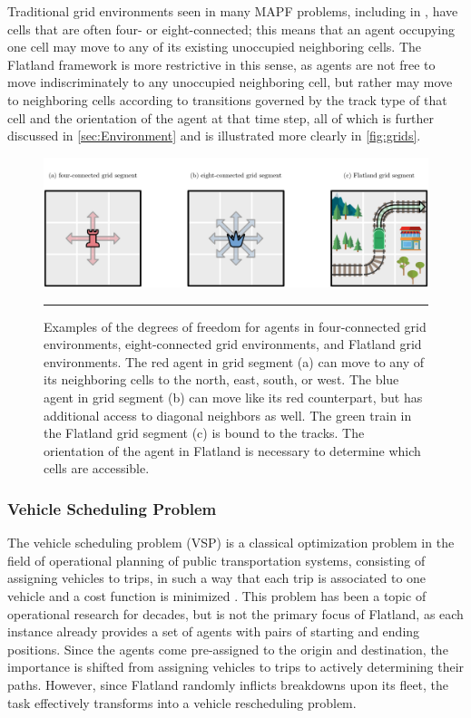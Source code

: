\documentclass[11pt]{article}
\begin{document}
Traditional grid environments seen in many MAPF problems, including in \citep{standley10a}, have cells that are often four- or eight-connected; this means that an agent occupying one cell may move to any of its existing unoccupied neighboring cells.  The Flatland framework is more restrictive in this sense, as agents are not free to move indiscriminately to any unoccupied neighboring cell, but rather may move to neighboring cells according to transitions governed by the track type of that cell and the orientation of the agent at that time step, all of which is further discussed in \autoref{sec:Environment} and is illustrated more clearly in \autoref{fig:grids}.

\begin{figure}[t]
\centering
\includegraphics[width=\textwidth]{chess2}
\caption{Examples of the degrees of freedom for agents in four-connected grid environments, eight-connected grid environments, and Flatland grid environments. The red agent in grid segment (a) can move to any of its neighboring cells to the north, east, south, or west.  The blue agent in grid segment (b) can move like its red counterpart, but has additional access to diagonal neighbors as well.  The green train in the Flatland grid segment (c) is bound to the tracks.  The orientation of the agent in Flatland is necessary to determine which cells are accessible. }
\label{fig:grids}

\begin{center}
{\color{lightgray} \rule{\linewidth}{0.15mm}}
\end{center}

\end{figure}

\subsubsection{Vehicle Scheduling Problem}
The vehicle scheduling problem (VSP) is a classical optimization problem in the field of operational planning of public transportation systems, consisting of assigning vehicles to trips, in such a way that each trip is associated to one vehicle and a cost function is minimized \citep{bapeukfa00a}.  This problem has been a topic of operational research for decades, but is not the primary focus of Flatland, as each instance already provides a set of agents with pairs of starting and ending positions. Since the agents come pre-assigned to the origin and destination, the importance is shifted from assigning vehicles to trips to actively determining their paths.  However, since Flatland randomly inflicts breakdowns upon its fleet, the task effectively transforms into a vehicle rescheduling problem.
\end{document}
